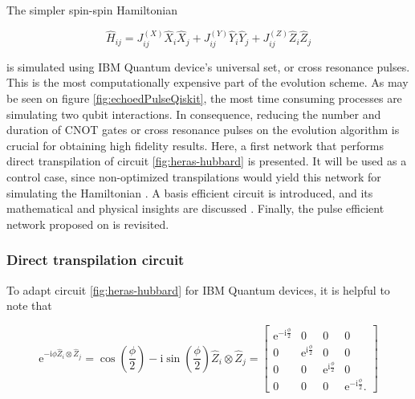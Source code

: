     The simpler spin-spin Hamiltonian

    \begin{equation}
      \hat{H}_{ij} = J_{ij}^{(X)} \hat{X}_i \hat{X}_j + J_{ij}^{(Y)} \hat{Y}_i \hat{Y}_j + J_{ij}^{(Z)} \hat{Z}_i \hat{Z}_j
      \label{eq:SpinSpin}
    \end{equation}

    \noindent is simulated using IBM Quantum device's universal set, or cross resonance pulses. This is the most computationally expensive part of the evolution scheme. As may be seen on figure \ref{fig:echoedPulseQiskit}, the most time consuming processes are simulating two qubit interactions. In consequence, reducing the number and duration of CNOT gates or cross resonance pulses on the evolution algorithm is crucial for obtaining high fidelity results. Here, a first network that performs direct transpilation of circuit \ref{fig:heras-hubbard} is presented. It will be used as a control case, since non-optimized transpilations would yield this network for simulating the Hamiltonian \cite{Qiskit}. A basis efficient circuit is introduced, and its mathematical and physical insights are discussed \cite{BellUniversalCartan}. Finally, the pulse efficient network proposed on \cite{RXZPulseEfficient} is revisited.
    
    \subsubsection{Direct transpilation circuit}
    \label{subsubsec:DirectTranspilationCircuit}

      To adapt circuit \ref{fig:heras-hubbard} for IBM Quantum devices, it is helpful to note that

      \begin{equation}
        \mathrm{e}^{-\mathrm{i}\phi \hat{Z}_i \otimes \hat{Z}_j} = \cos(\frac{\phi}{2}) - \mathrm{i}\sin(\frac{\phi}{2}) \hat{Z}_i \otimes \hat{Z}_j = 
        \begin{bmatrix}
          \mathrm{e}^{-\mathrm{i}\frac{\phi}{2}} & 0 & 0 & 0 \\
          0 & \mathrm{e}^{\mathrm{i}\frac{\phi}{2}} & 0 & 0 \\
          0 & 0 & \mathrm{e}^{\mathrm{i}\frac{\phi}{2}} & 0 \\
          0 & 0 & 0 & \mathrm{e}^{-\mathrm{i}\frac{\phi}{2}}.
        \end{bmatrix}
        \label{eq:expZZ}
      \end{equation}


